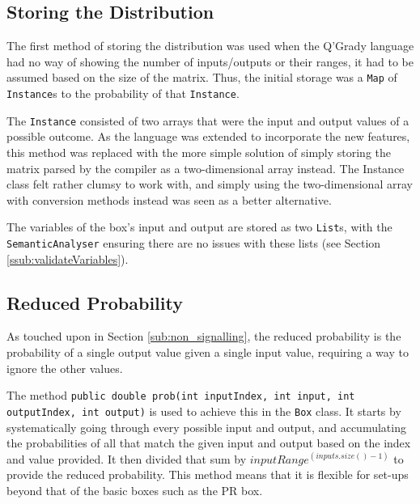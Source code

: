 \documentclass[report.tex]{subfiles}
\begin{document}
\subsection{Storing the Distribution} %
\label{sub:storing_the_distribution}
The first method of storing the distribution was used when the Q'Grady language
had no way of showing the number of inputs/outputs or their ranges, it had to be
assumed based on the size of the matrix. Thus, the initial storage was a
\texttt{Map} of \texttt{Instance}s to the probability of that \texttt{Instance}.

The \texttt{Instance} consisted of two arrays that were the input and output
values of a possible outcome. As the language was extended to incorporate
the new features, this method was replaced with the more simple solution of
simply storing the matrix parsed by the compiler as a two-dimensional array
instead. The Instance class felt rather clumsy to work with, and simply using
the two-dimensional array with conversion methods instead was seen as a better
alternative.

The variables of the box's input and output are stored as two \texttt{List}s,
with the \texttt{SemanticAnalyser} ensuring there are no issues with these
lists (see Section \ref{ssub:validateVariables}).

\subsection{Reduced Probability} %
\label{sub:reduced_probability}
As touched upon in Section \ref{sub:non_signalling}, the reduced probability is
the probability of a single output value given a single input value, requiring
a way to ignore the other values.

 

The method \texttt{public double prob(int inputIndex, int input,
int outputIndex, int output)} is used to achieve this in the \texttt{Box} class.
It starts by systematically going through every possible input and output, and
accumulating the probabilities of all that match the given input and output
based on the index and value provided. It then divided that sum by
\(inputRange ^ (inputs.size() - 1)\) to provide the reduced probability. This
method means that it is flexible for set-ups beyond that of the basic boxes such
as the PR box.
\end{document}
